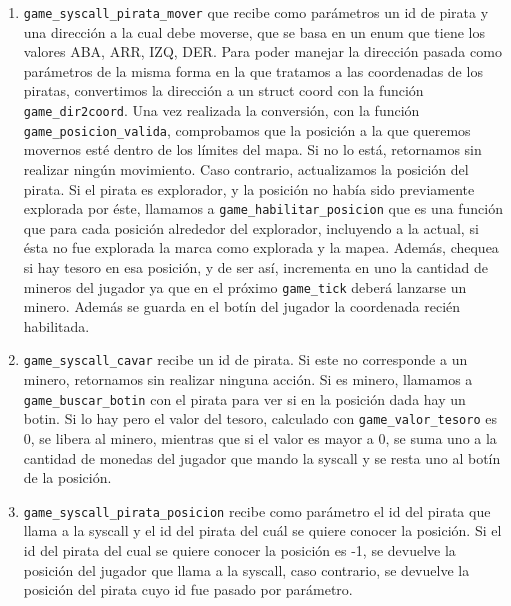 \begin{enumerate}

	\item \texttt{game\_syscall\_pirata\_mover} que recibe como parámetros un id de pirata y una dirección a la cual debe moverse, que se basa en un enum que tiene los valores ABA, ARR, IZQ, DER.
	Para poder manejar la dirección pasada como parámetros de la misma forma en la que tratamos a las coordenadas de los piratas, convertimos la dirección a un struct coord con la función \texttt{game\_dir2coord}. Una vez realizada la conversión, con la función \texttt{game\_posicion\_valida}, comprobamos que la posición a la que queremos movernos esté dentro de los límites del mapa. Si no lo está, retornamos sin realizar ningún movimiento. Caso contrario, actualizamos la posición del pirata. Si el pirata es explorador, y la posición no había sido previamente explorada por éste, llamamos a \texttt{game\_habilitar\_posicion} que es una función que para cada posición alrededor del explorador, incluyendo a la actual, si ésta no fue explorada la marca como explorada y la mapea. Además, chequea si hay tesoro en esa posición, y de ser así, incrementa en uno la cantidad de mineros del jugador ya que en el próximo \texttt{game\_tick} deberá lanzarse un minero. Además se guarda en el botín del jugador la coordenada recién habilitada.


	\item \texttt{game\_syscall\_cavar} recibe un id de pirata. Si este no corresponde a un minero, retornamos sin realizar ninguna acción.
	Si es minero, llamamos a \texttt{game\_buscar\_botin} con el pirata para ver si en la posición dada hay un botin. Si lo hay pero el valor del tesoro, calculado con \texttt{game\_valor\_tesoro} es 0, se libera al minero, mientras que si el valor es mayor a 0, se suma uno a la cantidad de monedas del jugador que mando la syscall y se resta uno al botín de la posición.

	\item \texttt{game\_syscall\_pirata\_posicion} recibe como parámetro el id del pirata que llama a la syscall y el id del pirata del cuál se quiere conocer la posición. Si el id del pirata del cual se quiere conocer la posición es -1, se devuelve la posición del jugador que llama a la syscall, caso contrario, se devuelve la posición del pirata cuyo id fue pasado por parámetro.

\end{enumerate}
